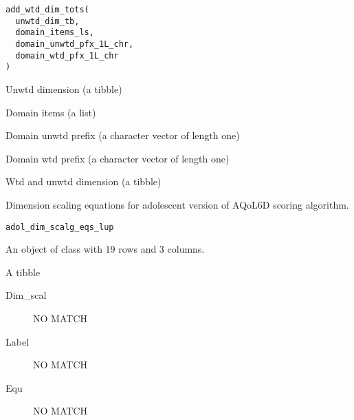 \documentclass[a4paper]{book}
\begin{document}
%
\begin{Usage}
\begin{verbatim}
add_wtd_dim_tots(
  unwtd_dim_tb,
  domain_items_ls,
  domain_unwtd_pfx_1L_chr,
  domain_wtd_pfx_1L_chr
)
\end{verbatim}
\end{Usage}
%
\begin{Arguments}
\begin{ldescription}
\item[\code{unwtd\_dim\_tb}] Unwtd dimension (a tibble)

\item[\code{domain\_items\_ls}] Domain items (a list)

\item[\code{domain\_unwtd\_pfx\_1L\_chr}] Domain unwtd prefix (a character vector of length one)

\item[\code{domain\_wtd\_pfx\_1L\_chr}] Domain wtd prefix (a character vector of length one)
\end{ldescription}
\end{Arguments}
%
\begin{Value}
Wtd and unwtd dimension (a tibble)
\end{Value}
%
\begin{Description}\relax
Dimension scaling equations for adolescent version of AQoL6D scoring algorithm.
\end{Description}
%
\begin{Usage}
\begin{verbatim}
adol_dim_scalg_eqs_lup
\end{verbatim}
\end{Usage}
%
\begin{Format}
An object of class  with 19 rows and 3 columns.
\end{Format}
%
\begin{Details}\relax
A tibble

\begin{description}

\item[Dim\_scal] NO MATCH
\item[Label] NO MATCH
\item[Equ] NO MATCH

\end{description}

\end{Details}
\end{document}
